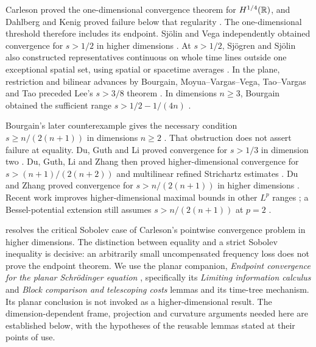 Carleson proved the one-dimensional convergence theorem for
$H^{1/4}(\mathbb R)$, and Dahlberg and Kenig proved failure below that
regularity \citep{Carleson1980,DahlbergKenig1982}.  The
one-dimensional threshold therefore includes its endpoint.
Sj\"olin and Vega independently obtained convergence for $s>1/2$
in higher dimensions \citep{Sjolin1987,Vega1988}.  At $s>1/2$,
Sj\"ogren and Sj\"olin also constructed representatives continuous
on whole time lines outside one exceptional spatial set, using spatial
or spacetime averages \citep[Theorem~2]{SjogrenSjolin1989}.  In the plane,
restriction and bilinear advances by Bourgain, Moyua--Vargas--Vega,
Tao--Vargas and Tao
\citep{Bourgain1995,MoyuaVargasVega1996,TaoVargas2000,Tao2003}
preceded Lee's $s>3/8$ theorem \citep{Lee2006}.  In dimensions
$n\geq3$, Bourgain obtained the sufficient range
$s>1/2-1/(4n)$ \citep{Bourgain2013}.

Bourgain's later counterexample gives the necessary condition
$s\geq n/(2(n+1))$ in dimensions $n\geq2$
\citep[Proposition~1]{Bourgain2016}.  That obstruction does not
assert failure at equality.  Du, Guth and Li proved convergence
for $s>1/3$ in dimension two
\citep[Theorems~1.1--1.2]{DuGuthLi2017}.  Du, Guth, Li and Zhang
then proved higher-dimensional convergence for
$s>(n+1)/(2(n+2))$ and multilinear refined Strichartz estimates
\citep[Theorems~1.1 and~4.2]{DuGuthLiZhang2018}.  Du and Zhang
proved convergence for $s>n/(2(n+1))$ in higher dimensions
\citep[Theorem~1.1]{DuZhang2019}.  Recent work improves
higher-dimensional maximal bounds in other $L^p$ ranges
\citep[Theorems~1.1--1.2]{DuLi2024}; a Bessel-potential
extension still assumes $s>n/(2(n+1))$ at $p=2$
\citep[Theorems~1.3--1.4]{PanSunTan2026}.

 resolves the critical Sobolev case of Carleson's
pointwise convergence problem in higher dimensions.  The distinction
between equality and a strict Sobolev inequality is decisive: an
arbitrarily small uncompensated frequency loss does not prove the
endpoint theorem.  We use the planar companion,
\emph{Endpoint convergence for the planar Schr\"odinger equation}
\citep[Sections~3 and~9]{PSE2026}, specifically its
\emph{Limiting information calculus} and \emph{Block comparison and
telescoping costs} lemmas and its time-tree mechanism.
Its planar conclusion is not invoked as a higher-dimensional result.  The
dimension-dependent frame, projection and curvature arguments needed
here are established below, with the hypotheses of the reusable
lemmas stated at their points of use.

